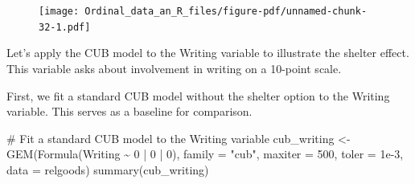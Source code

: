 \documentclass[
  letterpaper,
  DIV=11,
  numbers=noendperiod]{scrartcl}
\newenvironment{Shaded}{\begin{snugshade}}{\end{snugshade}}
\newcommand{\AttributeTok}[1]{\textcolor[rgb]{0.40,0.45,0.13}{#1}}
\newcommand{\CommentTok}[1]{\textcolor[rgb]{0.37,0.37,0.37}{#1}}
\newcommand{\DecValTok}[1]{\textcolor[rgb]{0.68,0.00,0.00}{#1}}
\newcommand{\FloatTok}[1]{\textcolor[rgb]{0.68,0.00,0.00}{#1}}
\newcommand{\FunctionTok}[1]{\textcolor[rgb]{0.28,0.35,0.67}{#1}}
\newcommand{\NormalTok}[1]{\textcolor[rgb]{0.00,0.23,0.31}{#1}}
\newcommand{\OtherTok}[1]{\textcolor[rgb]{0.00,0.23,0.31}{#1}}
\newcommand{\SpecialCharTok}[1]{\textcolor[rgb]{0.37,0.37,0.37}{#1}}
\newcommand{\StringTok}[1]{\textcolor[rgb]{0.13,0.47,0.30}{#1}}
\begin{document}
\begin{Shaded}
\end{Shaded}

\begin{figure}[H]

{\centering \texttt{[image: Ordinal\_data\_an\_R\_files/figure-pdf/unnamed-chunk-32-1.pdf]}

}

\end{figure}

Let's apply the CUB model to the Writing variable to illustrate the
shelter effect. This variable asks about involvement in writing on a
10-point scale.

First, we fit a standard CUB model without the shelter option to the
Writing variable. This serves as a baseline for comparison.

\begin{Shaded}
\begin{Highlighting}[]
\CommentTok{\# Fit a standard CUB model to the \textquotesingle{}Writing\textquotesingle{} variable}
\NormalTok{cub\_writing }\OtherTok{\textless{}{-}} \FunctionTok{GEM}\NormalTok{(}\FunctionTok{Formula}\NormalTok{(Writing }\SpecialCharTok{\textasciitilde{}} \DecValTok{0} \SpecialCharTok{|} \DecValTok{0} \SpecialCharTok{|} \DecValTok{0}\NormalTok{), }\AttributeTok{family =} \StringTok{"cub"}\NormalTok{,}
                  \AttributeTok{maxiter =} \DecValTok{500}\NormalTok{, }\AttributeTok{toler =} \FloatTok{1e{-}3}\NormalTok{, }\AttributeTok{data =}\NormalTok{ relgoods)}
\FunctionTok{summary}\NormalTok{(cub\_writing)}
\end{Highlighting}
\end{Shaded}
\end{document}
